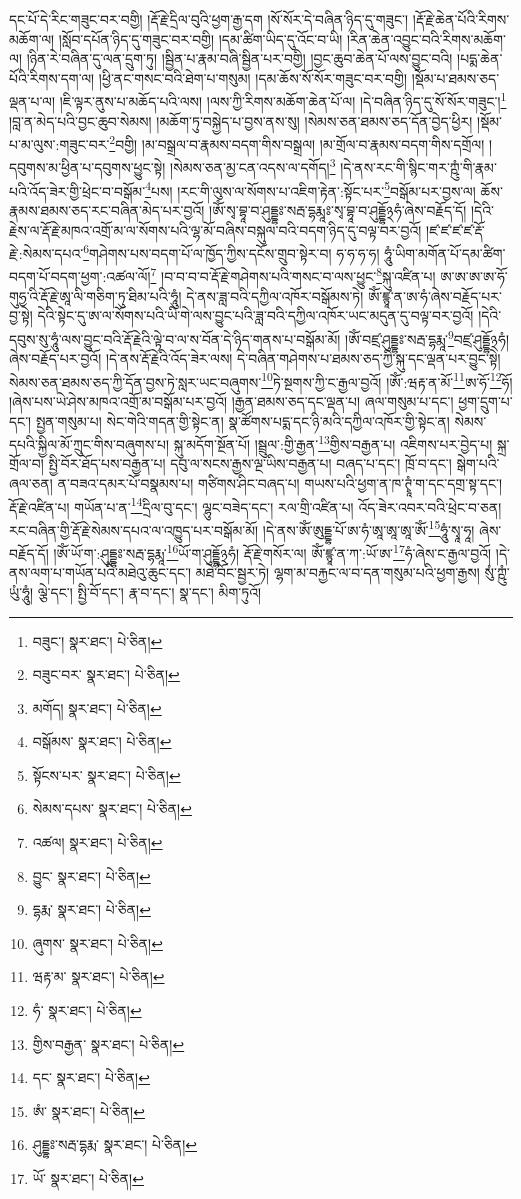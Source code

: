 དང་པོ་དེ་རིང་གཟུང་བར་བགྱི། །རྡོ་རྗེ་དྲིལ་བུའི་ཕྱག་རྒྱ་དག །སོ་སོར་དེ་བཞིན་ཉིད་དུ་གཟུང་། །རྡོ་རྗེ་ཆེན་པོའི་རིགས་མཆོག་ལ། །སློབ་དཔོན་ཉིད་དུ་གཟུང་བར་བགྱི། །དམ་ཚིག་ཡིད་དུ་འོང་བ་ཡི། །རིན་ཆེན་འབྱུང་བའི་རིགས་མཆོག་ལ། །ཉིན་རེ་བཞིན་དུ་ལན་དྲུག་ཏུ། །སྦྱིན་པ་རྣམ་བཞི་སྦྱིན་པར་བགྱི། །བྱང་ཆུབ་ཆེན་པོ་ལས་བྱུང་བའི། །པདྨ་ཆེན་པོའི་རིགས་དག་ལ། །ཕྱི་ནང་གསང་བའི་ཐེག་པ་གསུམ། །དམ་ཆོས་སོ་སོར་གཟུང་བར་བགྱི། །སྡོམ་པ་ཐམས་ཅད་ལྡན་པ་ལ། །ཇི་ལྟར་ནུས་པ་མཆོད་པའི་ལས། །ལས་ཀྱི་རིགས་མཆོག་ཆེན་པོ་ལ། །དེ་བཞིན་ཉིད་དུ་སོ་སོར་གཟུང་།\footnote{བཟུང་།  སྣར་ཐང་།  པེ་ཅིན། } །བླ་ན་མེད་པའི་བྱང་ཆུབ་སེམས། །མཆོག་ཏུ་བསྐྱེད་པ་བྱས་ནས་སུ། །སེམས་ཅན་ཐམས་ཅད་དོན་བྱེད་ཕྱིར། །སྡོམ་པ་མ་ལུས་:གཟུང་བར་\footnote{བཟུང་བར་  སྣར་ཐང་།  པེ་ཅིན། }བགྱི། །མ་བསྒྲལ་བ་རྣམས་བདག་གིས་བསྒྲལ། །མ་གྲོལ་བ་རྣམས་བདག་གིས་དགྲོལ། །དབུགས་མ་ཕྱིན་པ་དབུགས་ཕྱུང་སྟེ། །སེམས་ཅན་མྱ་ངན་འདས་ལ་དགོད།\footnote{མགོད།  སྣར་ཐང་།  པེ་ཅིན། } །དེ་ནས་རང་གི་སྙིང་གར་ཀྵུཾ་གི་རྣམ་པའི་འོད་ཟེར་གྱི་ཕྲེང་བ་བསྒོམ་\footnote{བསྒོམས་  སྣར་ཐང་།  པེ་ཅིན། }པས། །རང་གི་ལུས་ལ་སོགས་པ་འཇིག་རྟེན་:སྟོང་པར་\footnote{སྟོངས་པར་  སྣར་ཐང་།  པེ་ཅིན། }བསྒོམ་པར་བྱས་ལ། ཆོས་རྣམས་ཐམས་ཅད་རང་བཞིན་མེད་པར་བྱའོ། །ཨོཾ་སྭ་བྷཱ་བ་ཤུདྡྷཿ་སརྦ་དྷརྨཱཿ་སྭ་བྷཱ་བ་ཤུདྡྷོ྅ཧཾ་ཞེས་བརྗོད་དོ། །དེའི་རྗེས་ལ་རྡོ་རྗེ་མཁའ་འགྲོ་མ་ལ་སོགས་པའི་ལྷ་མོ་བཞིས་བསྐུལ་བའི་བདག་ཉིད་དུ་བལྟ་བར་བྱའོ། །ཛ་ཛ་ཛ་ཛ་རྡོ་རྗེ་:སེམས་དཔའ་\footnote{སེམས་དཔས་  སྣར་ཐང་།  པེ་ཅིན། }གཤེགས་པས་བདག་པོ་ལ་ཁྱོད་ཀྱིས་དངོས་གྲུབ་སྟེར་བ། ཧ་ཧ་ཧ་ཧ། ཧཱུཾ་ཡིག་མགོན་པོ་དམ་ཚིག་བདག་པོ་བདག་ཕྱག་:འཚལ་ལོ།\footnote{འཚལ།  སྣར་ཐང་།  པེ་ཅིན། } །བ་བ་བ་བ་རྡོ་རྗེ་གཤེགས་པའི་གསང་བ་ལས་ཕྱུང་\footnote{བྱུང་  སྣར་ཐང་།  པེ་ཅིན། }སྐུ་འཛིན་པ། ཨ་ཨ་ཨ་ཨ་ཧོ་གུཧྱ་འི་རྡོ་རྗེ་ཨཱ་ལི་གཅིག་ཏུ་ཐིམ་པའི་ཧཱུཾ། དེ་ནས་ཟླ་བའི་དཀྱིལ་འཁོར་བསྒོམས་ཏེ། ཨོཾ་ཛྙཱ་ན་ཨ་ཧཾ་ཞེས་བརྗོད་པར་བྱ་སྟེ། དེའི་སྟེང་དུ་ཨ་ལ་སོགས་པའི་ཡི་གེ་ལས་བྱུང་པའི་ཟླ་བའི་དཀྱིལ་འཁོར་ཡང་མདུན་དུ་བལྟ་བར་བྱའོ། །དེའི་དབུས་སུ་ཧཱུཾ་ལས་བྱུང་བའི་རྡོ་རྗེའི་ལྟེ་བ་ལ་ས་བོན་དེ་ཉིད་གནས་པ་བསྒོམ་མོ། །ཨོཾ་བཛྲ་ཤུདྡྷཿ་སརྦ་དྷརྨཱ་\footnote{དྷརྨ་  སྣར་ཐང་།  པེ་ཅིན། }བཛྲ་ཤུདྡྷོ྅ཧཾ། ཞེས་བརྗོད་པར་བྱའོ། །དེ་ནས་རྡོ་རྗེའི་འོད་ཟེར་ལས། དེ་བཞིན་གཤེགས་པ་ཐམས་ཅད་ཀྱི་སྐུ་དང་ལྡན་པར་བྱུང་སྟེ། སེམས་ཅན་ཐམས་ཅད་ཀྱི་དོན་བྱས་ཏེ་སླར་ཡང་བཞུགས་\footnote{ཞུགས་  སྣར་ཐང་།  པེ་ཅིན། }ཏེ་སྔགས་ཀྱི་ང་རྒྱལ་བྱའོ། །ཨོཾ་:ཝརྟ་ན་མོ་\footnote{ཝརྟ་མ་  སྣར་ཐང་།  པེ་ཅིན། }ཨ་ཧོ་\footnote{ཧཾ་  སྣར་ཐང་།  པེ་ཅིན། }ཧོ། །ཞེས་པས་ཡེ་ཤེས་མཁའ་འགྲོ་མ་བསྒོམ་པར་བྱའོ། །རྒྱན་ཐམས་ཅད་དང་ལྡན་པ། ཞལ་གསུམ་པ་དང་། ཕྱག་དྲུག་པ་དང་། སྤྱན་གསུམ་པ། སེང་གེའི་གདན་གྱི་སྟེང་ན། སྣ་ཚོགས་པདྨ་དང་ཉི་མའི་དཀྱིལ་འཁོར་གྱི་སྟེང་ན། སེམས་དཔའི་སྐྱིལ་མོ་ཀྲུང་གིས་བཞུགས་པ། སྐུ་མདོག་སྔོན་པོ། །སྦྲུལ་:གྱི་རྒྱན་\footnote{གྱིས་བརྒྱན་  སྣར་ཐང་།  པེ་ཅིན། }གྱིས་བརྒྱན་པ། འཇིགས་པར་བྱེད་པ། སྐྲ་གྲོལ་བ། སྤྱི་བོར་ཐོད་པས་བརྒྱན་པ། དབུ་ལ་སངས་རྒྱས་ལྔ་ཡིས་བརྒྱན་པ། བཞད་པ་དང་། ཁྲོ་བ་དང་། སྒེག་པའི་ཞལ་ཅན། ན་བཟའ་དམར་པོ་བསྣམས་པ། གཙིགས་ཤིང་བཞད་པ། གཡས་པའི་ཕྱག་ན་ཁ་ཊྭཱཾ་ག་དང་དགྲ་སྟ་དང་། རྡོ་རྗེ་འཛིན་པ། གཡོན་པ་ན་\footnote{དང་  སྣར་ཐང་།  པེ་ཅིན། }དྲིལ་བུ་དང་། ལྷུང་བཟེད་དང་། རལ་གྲི་འཛིན་པ། འོད་ཟེར་འབར་བའི་ཕྲེང་བ་ཅན། རང་བཞིན་གྱི་རྡོ་རྗེ་སེམས་དཔའ་ལ་འཁྱུད་པར་བསྒོམ་མོ། །དེ་ནས་ཨོཾ་ཨུདྡྷ་པོ་ཨ་ཧཾ་ཨཱ་ཨཱ་ཨཱ་ཨོཾ་\footnote{ཨཾ་  སྣར་ཐང་།  པེ་ཅིན། }ཧཱུཾ་སྭཱ་ཧཱ། ཞེས་བརྗོད་དོ། །ཨོཾ་ཡོ་ག་:ཤུདྡྷཿ་སརྦ་དྷརྨཱ་\footnote{ཤུདྡྷཿ་སརྦ་དྷརྨ་  སྣར་ཐང་།  པེ་ཅིན། }ཡོ་ག་ཤུདྡྷོ྅ཧཾ། རྡོ་རྗེ་གསོར་ལ། ཨོཾ་ཛྙཱ་ན་ཀ་:ཡོ་ཨ་\footnote{ཡོ་  སྣར་ཐང་།  པེ་ཅིན། }ཧཾ་ཞེས་ང་རྒྱལ་བྱའོ། །དེ་ནས་ལག་པ་གཡོན་པའི་མཐེའུ་ཆུང་དང་། མཐེ་བོང་སྦྱར་ཏེ། ལྷག་མ་བརྐྱང་ལ་བ་དན་གསུམ་པའི་ཕྱག་རྒྱས། སུཾ་ཀྵུཾ་ཡུཾ་ཧཱུཾ། ལྕེ་དང་། སྤྱི་བོ་དང་། རྣ་བ་དང་། སྣ་དང་། མིག་ཏུའོ། 